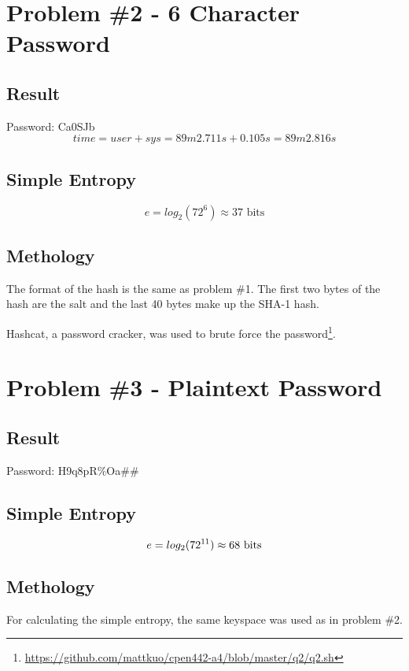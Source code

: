 \documentclass[conference]{IEEEtran}
\begin{document}
\section{Problem \#2 - 6 Character Password}

\subsection{Result}
  \noindent Password: Ca0SJb
  \begin{displaymath}
  time = user + sys = 89m2.711s + 0.105s = 89m2.816s
  \end{displaymath}

\subsection{Simple Entropy}
  \begin{displaymath}
    e = log_2(72^6) \approx 37 \mbox{ bits}
  \end{displaymath}

\subsection{Methology}

The format of the hash is the same as problem \#1. The first two bytes of the
hash are the salt and the last 40 bytes make up the SHA-1 hash.

Hashcat, a password cracker, was used to brute force the
password\footnote{\url{https://github.com/mattkuo/cpen442-a4/blob/master/q2/q2.sh}}.

\section{Problem \#3 - Plaintext Password}
\subsection{Result}
  \noindent Password: H9q8pR\%Oa\#\#

\subsection{Simple Entropy}
  \begin{displaymath}
    e = log_2(72^{11}) \approx 68 \mbox{ bits}\\
  \end{displaymath}

\subsection{Methology}
For calculating the simple entropy, the same keyspace was used as in problem \#2.
\end{document}
